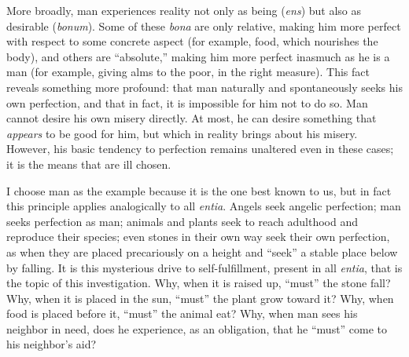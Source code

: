 %
More broadly, man experiences reality not only as being (\emph{ens}) but also as desirable (\emph{bonum}). Some of these \emph{bona} are only relative, making him more perfect with respect to some concrete aspect (for example, food, which nourishes the body), and others are “absolute,” making him more perfect inasmuch as he is a man (for example, giving alms to the poor, in the right measure). This fact reveals something more profound: that man naturally and spontaneously seeks his own perfection, and that in fact, it is impossible for him not to do so. Man cannot desire his own misery directly. At most, he can desire something that \emph{appears} to be good for him, but which in reality brings about his misery. However, his basic tendency to perfection remains unaltered even in these cases; it is the means that are ill chosen.

I choose man as the example because it is the one best known to us, but in fact this principle applies analogically to all \emph{entia}. Angels seek angelic perfection; man seeks perfection as man; animals and plants seek to reach adulthood and reproduce their species; even stones in their own way seek their own perfection, as when they are placed precariously on a height and “seek” a stable place below by falling. It is this mysterious drive to self-fulfillment, present in all \emph{entia}, that is the topic of this investigation. Why, when it is raised up, “must” the stone fall? Why, when it is placed in the sun, “must” the plant grow toward it? Why, when food is placed before it, “must” the animal eat? Why, when man sees his neighbor in need, does he experience, as an obligation, that he “must” come to his neighbor’s aid?

